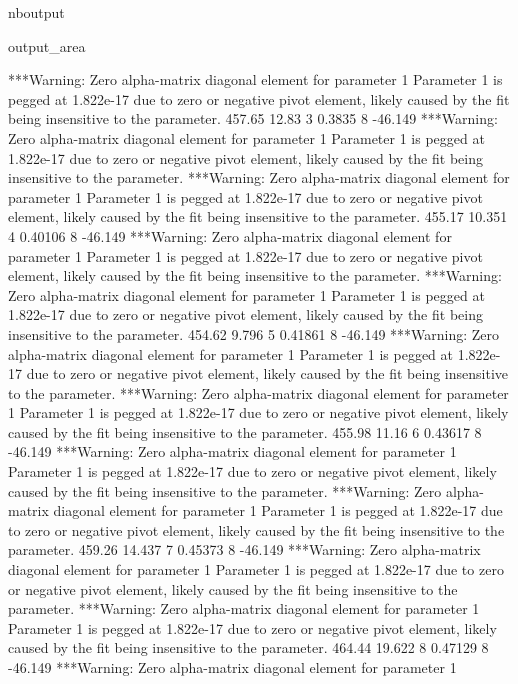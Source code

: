 \documentclass[letterpaper,10pt,english]{sphinxmanual}
\begin{document}
\begin{sphinxuseclass}{nboutput}
{\begin{sphinxuseclass}{output_area}
\begin{sphinxuseclass}{}
\begin{sphinxVerbatim}[commandchars=\\\{\}]
***Warning: Zero alpha-matrix diagonal element for parameter 1
 Parameter 1 is pegged at 1.822e-17 due to zero or negative pivot element, likely
 caused by the fit being insensitive to the parameter.
          457.65       12.83    3      0.3835    8     -46.149
***Warning: Zero alpha-matrix diagonal element for parameter 1
 Parameter 1 is pegged at 1.822e-17 due to zero or negative pivot element, likely
 caused by the fit being insensitive to the parameter.
***Warning: Zero alpha-matrix diagonal element for parameter 1
 Parameter 1 is pegged at 1.822e-17 due to zero or negative pivot element, likely
 caused by the fit being insensitive to the parameter.
          455.17      10.351    4     0.40106    8     -46.149
***Warning: Zero alpha-matrix diagonal element for parameter 1
 Parameter 1 is pegged at 1.822e-17 due to zero or negative pivot element, likely
 caused by the fit being insensitive to the parameter.
***Warning: Zero alpha-matrix diagonal element for parameter 1
 Parameter 1 is pegged at 1.822e-17 due to zero or negative pivot element, likely
 caused by the fit being insensitive to the parameter.
          454.62       9.796    5     0.41861    8     -46.149
***Warning: Zero alpha-matrix diagonal element for parameter 1
 Parameter 1 is pegged at 1.822e-17 due to zero or negative pivot element, likely
 caused by the fit being insensitive to the parameter.
***Warning: Zero alpha-matrix diagonal element for parameter 1
 Parameter 1 is pegged at 1.822e-17 due to zero or negative pivot element, likely
 caused by the fit being insensitive to the parameter.
          455.98       11.16    6     0.43617    8     -46.149
***Warning: Zero alpha-matrix diagonal element for parameter 1
 Parameter 1 is pegged at 1.822e-17 due to zero or negative pivot element, likely
 caused by the fit being insensitive to the parameter.
***Warning: Zero alpha-matrix diagonal element for parameter 1
 Parameter 1 is pegged at 1.822e-17 due to zero or negative pivot element, likely
 caused by the fit being insensitive to the parameter.
          459.26      14.437    7     0.45373    8     -46.149
***Warning: Zero alpha-matrix diagonal element for parameter 1
 Parameter 1 is pegged at 1.822e-17 due to zero or negative pivot element, likely
 caused by the fit being insensitive to the parameter.
***Warning: Zero alpha-matrix diagonal element for parameter 1
 Parameter 1 is pegged at 1.822e-17 due to zero or negative pivot element, likely
 caused by the fit being insensitive to the parameter.
          464.44      19.622    8     0.47129    8     -46.149
***Warning: Zero alpha-matrix diagonal element for parameter 1

\end{sphinxVerbatim}
\end{sphinxuseclass}
\end{sphinxuseclass}}
\end{sphinxuseclass}
\end{document}

